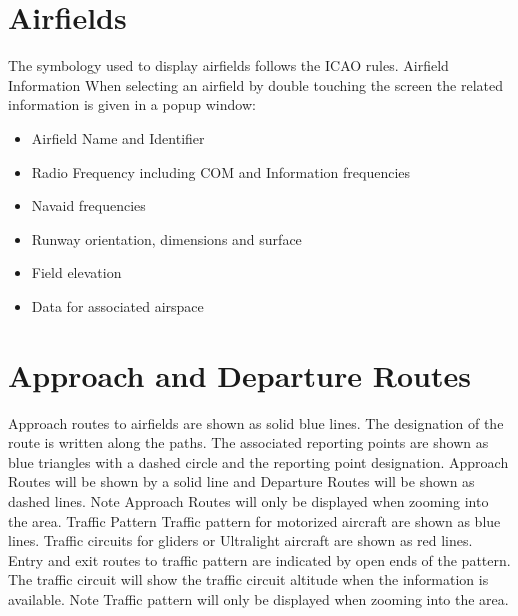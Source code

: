 \documentclass[letterpaper,10pt,english]{sphinxmanual}
\begin{document}
\section{Airfields}
\label{\detokenize{03-reference/airspace_display:airfields}}
\sphinxAtStartPar
The symbology used to display airfields follows the ICAO rules.
Airfield Information
When selecting an airfield by double touching the screen the related information is given in a pop\sphinxhyphen{}up window:
\begin{itemize}
\item {} 
\sphinxAtStartPar
Airfield Name and Identifier

\item {} 
\sphinxAtStartPar
Radio Frequency including COM and Information frequencies

\item {} 
\sphinxAtStartPar
Navaid frequencies

\item {} 
\sphinxAtStartPar
Runway orientation, dimensions and surface

\item {} 
\sphinxAtStartPar
Field elevation

\item {} 
\sphinxAtStartPar
Data for associated airspace

\end{itemize}


\section{Approach and Departure Routes}
\label{\detokenize{03-reference/airspace_display:approach-and-departure-routes}}
\sphinxAtStartPar
Approach routes to airfields are shown as solid blue lines. The designation of the route is written along the paths. The associated reporting points are shown as blue triangles with a dashed circle and the reporting point designation.
Approach Routes will be shown by a solid line and Departure Routes will be shown as  dashed lines.
Note
Approach Routes will only be displayed when zooming into the area.
Traffic Pattern
Traffic pattern for motorized aircraft are shown as blue lines.
Traffic circuits for gliders or Ultralight aircraft are shown as red lines.
Entry and exit routes to traffic pattern are indicated by open ends of the pattern.
The traffic circuit will show the traffic circuit altitude when the information is available.
Note
Traffic pattern will only be displayed when zooming into the area.
\end{document}
